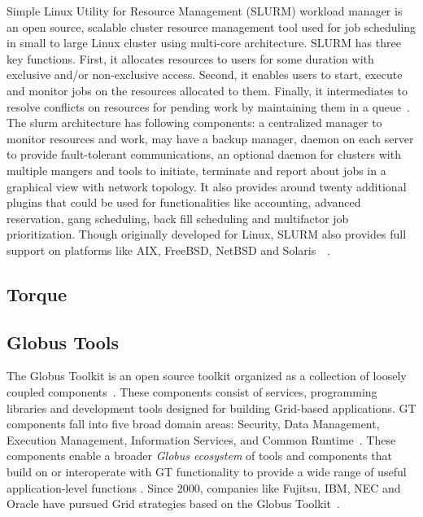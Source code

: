 {Simple Linux Utility for Resource Management (SLURM) workload manager
is an open source, scalable cluster resource management tool used for
job scheduling in small to large Linux cluster using multi-core
architecture. SLURM has three key functions. First, it allocates
resources to users for some duration with exclusive and/or
non-exclusive access. Second, it enables users to start, execute and
monitor jobs on the resources allocated to them. Finally, it
intermediates to resolve conflicts on resources for pending work by
maintaining them in a queue~\cite{www-slurmSchedmdSite}. The slurm
architecture has following components: a centralized manager to
monitor resources and work, may have a backup manager, daemon on each
server to provide fault-tolerant communications, an optional daemon
for clusters with multiple mangers and tools to initiate, terminate
and report about jobs in a graphical view with network topology. It
also provides around twenty additional plugins that could be used for
functionalities like accounting, advanced reservation, gang
scheduling, back fill scheduling and multifactor job
prioritization. Though originally developed for Linux, SLURM also
provides full support on platforms like AIX, FreeBSD, NetBSD and
Solaris~\cite{www-slurmPlatformsSite}~\cite{www-slurm}.

     \pv
     
\subsection{Torque}

\pv 

\subsection{Globus Tools \cv}

The Globus Toolkit is an open source toolkit organized as a collection
of loosely coupled components~\cite{sotomayor2006globus}. These
components consist of services, programming libraries and development
tools designed for building Grid-based applications. GT components
fall into five broad domain areas: Security, Data Management,
Execution Management, Information Services, and Common
Runtime~\cite{foster2006globus}. These components enable a broader
\textit{Globus ecosystem} of tools and components that build on or
interoperate with GT functionality to provide a wide range of useful
application-level functions \cite{www-about-globus}. Since 2000,
companies like Fujitsu, IBM, NEC and Oracle have pursued Grid
strategies based on the Globus Toolkit~\cite{www-about-globus}.

}
